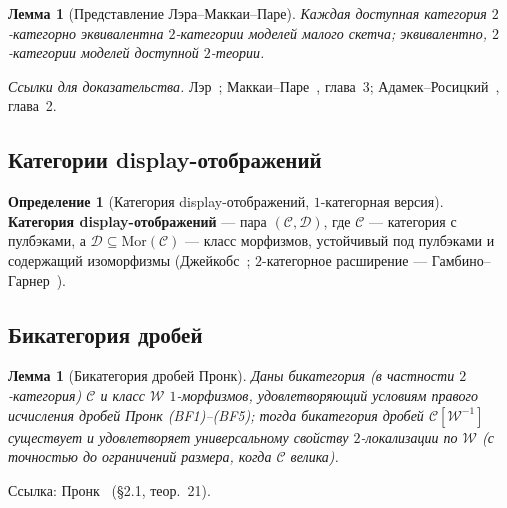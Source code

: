 \documentclass[11pt]{article}
\theoremstyle{plain}
\newtheorem{lemma}[theorem]{Лемма}
\theoremstyle{definition}
\newtheorem{definition}[theorem]{Определение}
\newcommand{\cC}{\mathcal{C}}
\newcommand{\cD}{\mathcal{D}}
\newcommand{\Mor}{\mathrm{Mor}}
\begin{document}
\begin{lemma}[Представление Лэра--Маккаи--Паре]\label{lem:lair}
Каждая доступная категория $2$-категорно эквивалентна $2$-категории моделей малого скетча; эквивалентно, $2$-категории моделей доступной $2$-теории.
\end{lemma}

\noindent\emph{Ссылки для доказательства.} Лэр~\cite{Lair1981}; Маккаи--Паре~\cite{MakkaiPare1989}, глава~3; Адамек--Росицкий~\cite{AdamekRosicky1994}, глава~2.

\subsection{Категории display-отображений}

\begin{definition}[Категория display-отображений, $1$-категорная версия]\label{def:display-1cat}
\textbf{Категория display-отображений} — пара $(\cC, \cD)$, где $\cC$ — категория с пулбэками, а $\cD \subseteq \Mor(\cC)$ — класс морфизмов, устойчивый под пулбэками и содержащий изоморфизмы (Джейкобс~\cite{Jacobs1999}; $2$-категорное расширение — Гамбино--Гарнер~\cite{GambinoGarner2008}).
\end{definition}

\subsection{Бикатегория дробей}

\begin{lemma}[Бикатегория дробей Пронк]\label{lem:pronk}
Даны бикатегория (в частности $2$-категория) $\cC$ и класс $\mathcal{W}$ $1$-морфизмов, удовлетворяющий условиям правого исчисления дробей Пронк (BF1)--(BF5); тогда бикатегория дробей $\cC[\mathcal{W}^{-1}]$ существует и удовлетворяет универсальному свойству $2$-локализации по $\mathcal{W}$ (с точностью до ограничений размера, когда $\cC$ велика).
\end{lemma}

Ссылка: Пронк~\cite{Pronk1996} (\S 2.1, теор.~21).
\end{document}
